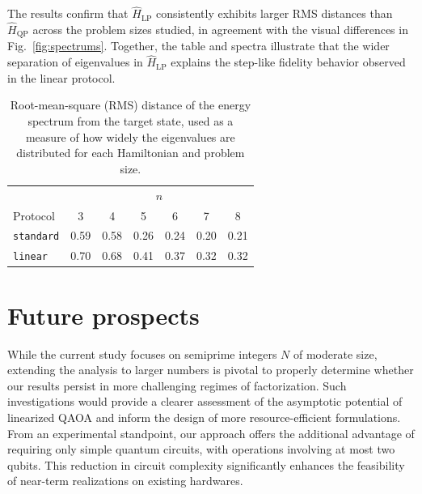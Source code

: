 The results confirm that $\hat{H}_\mathrm{LP}$ consistently exhibits larger RMS distances than $\hat{H}_\mathrm{QP}$ across the problem sizes studied, in agreement with the visual differences in Fig.~\ref{fig:spectrums}. Together, the table and spectra illustrate that the wider separation of eigenvalues in $\hat{H}_\mathrm{LP}$ explains the step-like fidelity behavior observed in the linear protocol.

\begin{table}[h]
    \centering
    \begin{tabular}{@{}lcccccc@{}}
        \toprule
        & \multicolumn{6}{c}{$n$} \\
        \cmidrule(lr){2-7}
        Protocol            & 3     & 4     & 5     & 6     & 7     & 8 \\
        \midrule
        \texttt{standard}   & 0.59  & 0.58  & 0.26  & 0.24  & 0.20  & 0.21 \\
        \texttt{linear}     & 0.70  & 0.68  & 0.41  & 0.37  & 0.32  & 0.32 \\
        \bottomrule
    \end{tabular}
    \caption{Root-mean-square (RMS) distance of the energy spectrum from the target state, used as a measure of how widely the eigenvalues are distributed for each Hamiltonian and problem size.}
    \label{table:rms}
\end{table}


\section{Future prospects}

While the current study focuses on semiprime integers $N$ of moderate size, extending the analysis to larger numbers is pivotal to properly determine whether our results persist in more challenging regimes of factorization. Such investigations would provide a clearer assessment of the asymptotic potential of linearized QAOA and inform the design of more resource-efficient formulations. From an experimental standpoint, our approach offers the additional advantage of requiring only simple quantum circuits, with operations involving at most two qubits. This reduction in circuit complexity significantly enhances the feasibility of near-term realizations on existing hardwares.
